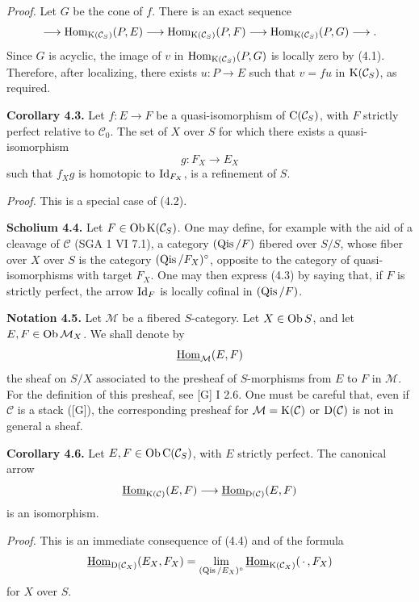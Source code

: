 \documentclass[11pt]{article}
\begin{document}
\emph{Proof.} Let \(G\) be the cone of \(f\). There is an exact sequence
\[
  \longrightarrow \operatorname{Hom}_{\mathrm K(\mathcal C_S)}(P,E)
  \longrightarrow \operatorname{Hom}_{\mathrm K(\mathcal C_S)}(P,F)
  \longrightarrow \operatorname{Hom}_{\mathrm K(\mathcal C_S)}(P,G)
  \longrightarrow .
\]
Since \(G\) is acyclic, the image of \(v\) in \(\operatorname{Hom}_{\mathrm K(\mathcal C_S)}(P,G)\) is locally zero by (4.1). Therefore, after localizing, there exists \(u:P\to E\) such that \(v=fu\) in \(\mathrm K(\mathcal C_S)\), as required.

\textbf{Corollary 4.3.} Let \(f:E\to F\) be a quasi-isomorphism of \(\mathrm C(\mathcal C_S)\), with \(F\) strictly perfect relative to \(\mathcal C_0\). The set of \(X\) over \(S\) for which there exists a quasi-isomorphism
\[
  g:F_X\longrightarrow E_X
\]
such that \(f_Xg\) is homotopic to \(\operatorname{Id}_{F_X}\), is a refinement of \(S\).

\emph{Proof.} This is a special case of (4.2).

\textbf{Scholium 4.4.} Let \(F\in\operatorname{Ob}\mathrm K(\mathcal C_S)\). One may define, for example with the aid of a cleavage of \(\mathcal C\) (SGA 1 VI 7.1), a category \((\operatorname{Qis}/F)\) fibered over \(S/S\), whose fiber over \(X\) over \(S\) is the category \((\operatorname{Qis}/F_X)^\circ\), opposite to the category of quasi-isomorphisms with target \(F_X\). One may then express (4.3) by saying that, if \(F\) is strictly perfect, the arrow \(\operatorname{Id}_F\) is locally cofinal in \((\operatorname{Qis}/F)\).

\textbf{Notation 4.5.} Let \(\mathcal M\) be a fibered \(S\)-category. Let \(X\in\operatorname{Ob} S\), and let \(E,F\in\operatorname{Ob}\mathcal M_X\). We shall denote by
\[
  \underline{\operatorname{Hom}}_{\mathcal M}(E,F)
\]
the sheaf on \(S/X\) associated to the presheaf of \(S\)-morphisms from \(E\) to \(F\) in \(\mathcal M\). For the definition of this presheaf, see [G] I 2.6. One must be careful that, even if \(\mathcal C\) is a stack ([G]), the corresponding presheaf for \(\mathcal M=\mathrm K(\mathcal C)\) or \(\mathrm D(\mathcal C)\) is not in general a sheaf.

\textbf{Corollary 4.6.} Let \(E,F\in\operatorname{Ob}\mathrm C(\mathcal C_S)\), with \(E\) strictly perfect. The canonical arrow
\[
  \underline{\operatorname{Hom}}_{\mathrm K(\mathcal C)}(E,F)
  \longrightarrow
  \underline{\operatorname{Hom}}_{\mathrm D(\mathcal C)}(E,F)
\]
is an isomorphism.

\emph{Proof.} This is an immediate consequence of (4.4) and of the formula
\[
  \underline{\operatorname{Hom}}_{\mathrm D(\mathcal C_X)}(E_X,F_X)
  = \lim_{(\operatorname{Qis}/E_X)^\circ}\underline{\operatorname{Hom}}_{\mathrm K(\mathcal C_X)}(\,\cdot\,,F_X)
\]
for \(X\) over \(S\).
\end{document}
